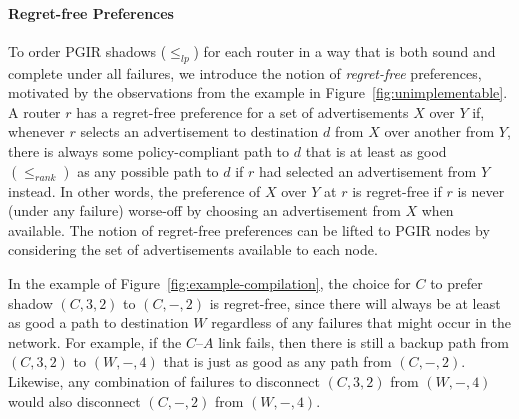 \documentclass[10pt]{sigalternate052015}
\newcommand{\para}[1]{\paragraph*{\textbf{#1}}}
\begin{document}
\para{Regret-free Preferences}
To order PGIR shadows ($\leq_{lp}$) for each router in a way that is both sound and complete under all failures, we introduce the notion of \emph{regret-free} preferences, motivated by the observations from the example in Figure~\ref{fig:unimplementable}. A router $r$ has a regret-free preference for a set of advertisements $X$ over $Y$ if, whenever $r$ selects an advertisement to destination $d$ from $X$ over another from $Y$, there is always some policy-compliant path to $d$ that is at least as good $(\leq_{rank})$ as any possible path to $d$ if $r$ had selected an advertisement from $Y$ instead. In other words, the preference of $X$ over $Y$ at $r$ is regret-free if $r$ is never (under any failure) worse-off by choosing an advertisement from $X$ when available. The notion of regret-free preferences can be lifted to PGIR nodes by considering the set of advertisements available to each node.

In the example of Figure~\ref{fig:example-compilation}, the choice for $C$ to prefer shadow $(C,3,2)$ to $(C,-,2)$ is regret-free, since there will always be at least as good a path to destination $W$ regardless of any failures that might occur in the network. For example, if the $C$--$A$ link fails, then there is still a backup path from $(C,3,2)$ to $(W,-,4)$ that is just as good as any path from $(C,-,2)$. Likewise, any combination of failures to disconnect $(C,3,2)$ from $(W,-,4)$ would also disconnect $(C,-,2)$ from $(W,-,4)$.

%
%
%
\end{document}
